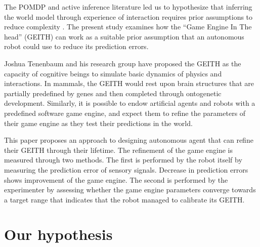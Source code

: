 \documentclass[runningheads]{llncs}
\begin{document}
The POMDP and active inference literature led us to hypothesize that inferring the world model through experience of interaction requires prior assumptions to reduce complexity \cite{georgeon_artificial_2024}. 
The present study examines how the ``Game Engine In The head'' (GEITH) can work as a suitable prior assumption that an autonomous robot could use to reduce its prediction errors. 

Joshua Tenenbaum and his research group have proposed the GEITH \cite{battaglia_simulation_2013} as the capacity of cognitive beings to simulate basic dynamics of physics and interactions. 
In mammals, the GEITH would rest upon brain structures that are partially predefined by genes and then completed through ontogenetic development.  
Similarly, it is possible to endow artificial agents and robots with a predefined software game engine, and expect them to refine the parameters of their game engine as they test their predictions in the world.

This paper proposes an approach to designing autonomous agent that can refine their GEITH through their lifetime.
The refinement of the game engine is measured through two methods. 
The first is performed by the robot itself by measuring the prediction error of sensory signals. 
Decrease in prediction errors shows improvement of the game engine. 
The second is performed by the experimenter by assessing whether the game engine parameters converge towards a target range that indicates that the robot managed to calibrate its GEITH. 




\section{Our hypothesis}
\end{document}
